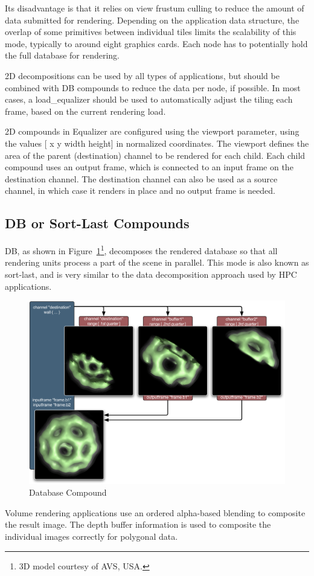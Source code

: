\documentclass[10pt,a4]{scrartcl}
\newcommand{\fig}[1]{Figure~\ref{#1}}
\begin{document}
Its disadvantage is that it relies on view frustum culling to reduce the
amount of data submitted for rendering. Depending on the application
data structure, the overlap of some primitives between individual tiles
limits the scalability of this mode, typically to around eight graphics
cards. Each node has to potentially hold the full database for
rendering.

2D decompositions can be used by all types of applications, but should
be combined with DB compounds to reduce the data per node, if
possible. In most cases, a \textsf{load\_equalizer} should be used to
automatically adjust the tiling each frame, based on the current
rendering load.

2D compounds in Equalizer are configured using the \textsf{viewport}
parameter, using the values \textsf{[ x y width height]} in normalized
coordinates. The viewport defines the area of the parent (destination)
channel to be rendered for each child. Each child compound uses an
output frame, which is connected to an input frame on the destination
channel. The destination channel can also be used as a source channel,
in which case it renders in place and no output frame is needed.

\subsection{DB or Sort-Last Compounds}

DB, as shown in \fig{fDB}\footnote{3D model courtesy of AVS, USA.}, decomposes
the rendered database so that all rendering units process a part of the scene in
parallel. This mode is also known as sort-last, and is very similar to the data
decomposition approach used by HPC applications.

\begin{figure}
  \includegraphics[width=.618\textwidth]{images/DB.pdf}
  {\caption{\label{fDB}Database Compound}}
\end{figure}
Volume rendering applications use an ordered alpha-based blending to
composite the result image. The depth buffer information is used to
composite the individual images correctly for polygonal data. 
\end{document}
